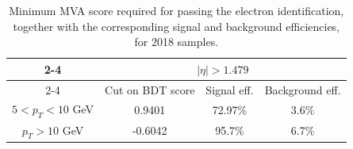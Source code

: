 \begin{table}[h!]
\begin{tabular}{|c|c c c}
\cline{2-4}
  \multicolumn{1}{ c|}{}             & \multicolumn{3}{|c|}{$|\eta| > 1.479$}                        \\
\cline{2-4} %
   \multicolumn{1}{c|}{}            & Cut on BDT score & Signal eff. & \multicolumn{1}{c|}{Background eff.}  \\
\hline  %
$ 5 < p_T < 10 $ GeV              & 0.9401                     & 72.97\%    &  \multicolumn{1}{c|}{3.6\%}     \\
\hline %
$p_T > 10$ GeV                      & -0.6042		   & 95.7\%      &  \multicolumn{1}{c|}{6.7\%}		\\
\hline %

     \end{tabular}
\small
    \caption{Minimum MVA score required for passing the electron identification, together with the corresponding signal and background efficiencies, for 2018 samples.}
\label{tab:ele_ID_WPC}
\end{table}

\clearpage
